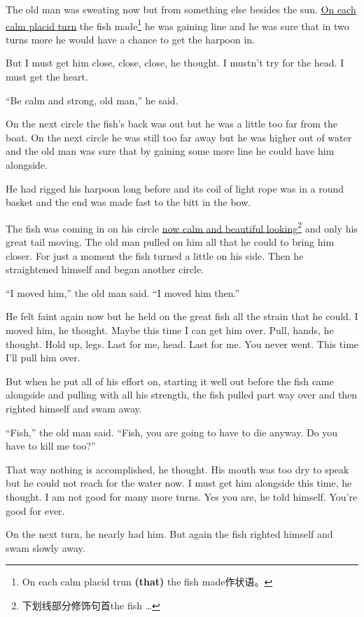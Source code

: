 \documentclass[fontset=ubuntu,zihao=-4]{ctexrep}
\begin{document}
The old man was sweating now but from something else \gls{besides} the
sun. \uline{On each calm \gls{placid} turn} the fish made\footnote{On each calm
  placid trun \textbf{(that)} the fish made作状语。} he was gaining line and
he was sure that in two turns more he would have a chance to get the harpoon
in.

But I must get him close, close, close, he thought. I mustn't try for the
head. I must get the heart.

``Be calm and strong, old man,'' he said.

On the next circle the fish's back was out but he was a little too far from
the boat. On the next circle he was still too far away but he was higher out
of water and the old man was sure that by \gls{gaining} some more line he could
have him alongside.

He had rigged his harpoon long before and its coil of light rope was in a
round basket and the end was made fast to the bitt in the bow.

The fish was coming in on his circle \uline{now calm and beautiful
  looking}\footnote{下划线部分修饰句首the fish \ldots{}} and only his great tail
moving. The old man pulled on him all that he could to bring him closer. For
just a moment the fish turned a little on his side. Then he
\gls{straightened} himself and began another circle.

``I moved him,'' the old man said. ``I moved him then.''

He felt faint again now but he held on the great fish all the strain that he
could. I moved him, he thought. Maybe this time I can get him over. Pull,
hands, he thought. Hold up, legs. Last for me, head. Last for me. You never
went. This time I'll pull him over.

But when he put all of his effort on, starting it well out before the fish
came alongside and pulling with all his strength, the fish pulled part way
over and then righted himself and swam away.

``Fish,'' the old man said. ``Fish, you are going to have to die anyway. Do
you have to kill me too?''

That way nothing is \gls{accomplished}, he thought. His mouth was too dry to
speak but he could not reach for the water now. I must get him alongside
this time, he thought. I am not good for many more turns. Yes you are, he
told himself. You're good for ever.

On the next turn, he nearly had him. But again the fish righted himself and
swam slowly away.
\end{document}
